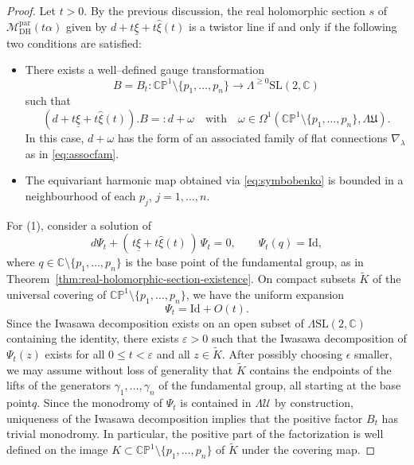 \documentclass[12pt,a4paper]{amsart}
\theoremstyle{definition}
\theoremstyle{remark}
\newcommand{\C}{\mathbb C}
\newcommand{\CP}{\mathbb{CP}}
\begin{document}
\begin{proof}
Let $t>0$.
By the previous discussion, the real holomorphic section $s$ of 
$\mathcal M_{\mathrm{DH}}^{\mathrm{par}}(t\alpha)$
given by
$d+t\underline\xi+t\hat\xi(t)$  is a twistor line if and only if
the following two conditions are satisfied:
\begin{itemize}
\item[(1)]
There exists a well--defined gauge transformation
\[
B=B_t\colon \CP^1\setminus\{p_1,\dots,p_n\}\to \Lambda^{\geq0}\mathrm{SL}(2,\C)
\]
such that
\[
(d+t\underline\xi+t\hat\xi(t)). B
=:
d+\omega
\quad \text{with} \quad
\omega\in\Omega^1(\CP^1\setminus\{p_1,\dots,p_n\},\Lambda\mathfrak U).
\]
In this case, $d+\omega$ has the form of an associated family of flat connections
$\nabla_\lambda$ as in \eqref{eq:assocfam}.
\item[(2)]
The equivariant harmonic map obtained via \eqref{eq:symbobenko} is bounded
 in a 
neighbourhood of each $p_j$, $j=1,\dots,n$.
\end{itemize}

For (1), consider a solution of
\[
d\Psi_t+(\,t\underline\xi+t\hat\xi(t)\,)\,\Psi_t=0,
\qquad
\Psi_t(q)=\mathrm{Id},
\]
where $q\in \C\setminus\{p_1,\dots,p_n\}$ is the base point of the fundamental group, as in
Theorem~\ref{thm:real-holomorphic-section-existence}.
On compact subsets $\tilde K$ of the universal covering of
$\CP^1\setminus\{p_1,\dots,p_n\}$, we have the uniform expansion
\[
\Psi_t=\mathrm{Id}+O(t).
\]
Since the Iwasawa decomposition exists on an open subset of
$\Lambda\mathrm{SL}(2,\C)$ containing the identity, there exists $\varepsilon>0$
such that the Iwasawa decomposition of $\Psi_t(z)$ exists for all
$0\leq t<\varepsilon$ and all $z\in \tilde K$.
After possibly choosing 
 $\epsilon$ smaller, we may assume without loss of generality that  $\tilde K$ contains the endpoints of
the lifts of the generators $\gamma_1,\dots,\gamma_n$ of the fundamental group,
all starting at the base point$q$.
Since the monodromy of $\Psi_t$ is contained in $\Lambda\mathcal U$ by construction,
uniqueness of the Iwasawa decomposition implies that the positive factor $B_t$ has trivial monodromy.
In particular, the positive part of the factorization is well defined on the image
$K\subset \CP^1\setminus\{p_1,\dots,p_n\}$ of $\tilde K$ under the covering map.


\end{proof}
\end{document}
